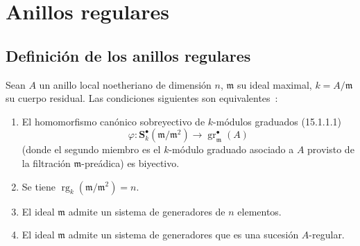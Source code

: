 \section{Anillos regulares}
\label{section:0.17-es}

\subsection{Definición de los anillos regulares}
\label{subsection:0.17.1-es}

\begin{proposition}[17.1.1]
\label{0.17.1.1-es}
Sean $A$ un anillo local noetheriano de dimensión $n$, $\mathfrak{m}$ su
ideal maximal, $k=A/\mathfrak{m}$ su cuerpo residual. Las condiciones siguientes
son equivalentes~:
\begin{enumerate}
  \item[\rm a)] El homomorfismo canónico sobreyectivo de $k$-módulos graduados
  \textup{(15.1.1.1)}
  \[
    \varphi:\mathbf S^\bullet_k(\mathfrak{m}/\mathfrak{m}^2)
    \longrightarrow\operatorname{gr}^\bullet_{\mathfrak{m}}(A)
  \]
  (donde el segundo miembro es el $k$-módulo graduado asociado a $A$ provisto de
  la filtración $\mathfrak{m}$-preádica) es biyectivo.
  \item[\rm b)] Se tiene
  $\operatorname{rg}_k(\mathfrak{m}/\mathfrak{m}^2)=n$.
  \item[\rm c)] El ideal $\mathfrak{m}$ admite un sistema de generadores de $n$
  elementos.
  \item[\rm d)] El ideal $\mathfrak{m}$ admite un sistema de generadores que es
  una sucesión $A$-regular.
\end{enumerate}
\end{proposition}


